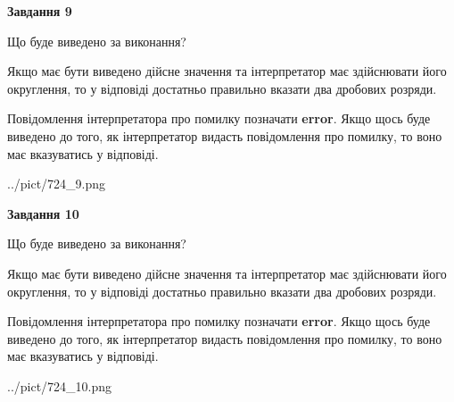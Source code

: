 \documentclass[12pt, ukrainian]{article}
\begin{document}
{\begin {Large}
{\begin {center}\textbf{Завдання 9}\end {center}}\par
Що буде виведено за виконання? \par

Якщо має бути виведено дійсне значення та інтерпретатор має здійснювати його округлення, 
то у відповіді достатньо правильно вказати два дробових розряди.

Повідомлення інтерпретатора про помилку позначати \textbf{error}.
Якщо щось буде виведено до того, як інтерпретатор видасть повідомлення про помилку, 
то воно має вказуватись у відповіді. \par

\begin{center}
	{../pict/724_9.png}
\end{center}
\newpage

{\begin {center}\textbf{Завдання 10}\end {center}}\par
Що буде виведено за виконання? \par

Якщо має бути виведено дійсне значення та інтерпретатор має здійснювати його округлення, 
то у відповіді достатньо правильно вказати два дробових розряди.

Повідомлення інтерпретатора про помилку позначати \textbf{error}.
Якщо щось буде виведено до того, як інтерпретатор видасть повідомлення про помилку, 
то воно має вказуватись у відповіді. \par

\begin{center}
	{../pict/724_10.png}
\end{center}
\newpage

\end {Large}}
\end{document}
